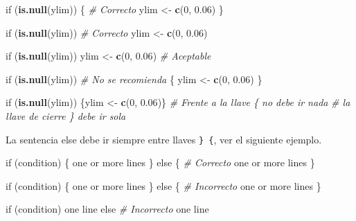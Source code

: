 \documentclass[10pt,]{krantz}
\makeatletter
\newenvironment{Shaded}{\begin{snugshade}}{\end{snugshade}}
\newcommand{\KeywordTok}[1]{\textcolor[rgb]{0.13,0.29,0.53}{\textbf{{#1}}}}
\newcommand{\DecValTok}[1]{\textcolor[rgb]{0.00,0.00,0.81}{{#1}}}
\newcommand{\FloatTok}[1]{\textcolor[rgb]{0.00,0.00,0.81}{{#1}}}
\newcommand{\StringTok}[1]{\textcolor[rgb]{0.31,0.60,0.02}{{#1}}}
\newcommand{\CommentTok}[1]{\textcolor[rgb]{0.56,0.35,0.01}{\textit{{#1}}}}
\newcommand{\NormalTok}[1]{{#1}}
\newenvironment{kframe}{%
\medskip{}
\setlength{\fboxsep}{.8em}
 \def\at@end@of@kframe{}%
 \ifinner\ifhmode%
  \def\at@end@of@kframe{\end{minipage}}%
  \begin{minipage}{\columnwidth}%
 \fi\fi%
 \def\FrameCommand##1{\hskip\@totalleftmargin \hskip-\fboxsep
 \colorbox{shadecolor}{##1}\hskip-\fboxsep
     \hskip-\linewidth \hskip-\@totalleftmargin \hskip\columnwidth}%
 \MakeFramed {\advance\hsize-\width
   \@totalleftmargin\z@ \linewidth\hsize
   \@setminipage}}%
 {\par\unskip\endMakeFramed%
 \at@end@of@kframe}
\renewenvironment{Shaded}{\begin{kframe}}{\end{kframe}}
\makeatother
\begin{document}
\begin{Shaded}
\begin{Highlighting}[]
\NormalTok{if (}\KeywordTok{is.null}\NormalTok{(ylim)) \{                     }\CommentTok{# Correcto}
  \NormalTok{ylim <-}\StringTok{ }\KeywordTok{c}\NormalTok{(}\DecValTok{0}\NormalTok{, }\FloatTok{0.06}\NormalTok{)}
\NormalTok{\}}

\NormalTok{if (}\KeywordTok{is.null}\NormalTok{(ylim))                       }\CommentTok{# Correcto}
  \NormalTok{ylim <-}\StringTok{ }\KeywordTok{c}\NormalTok{(}\DecValTok{0}\NormalTok{, }\FloatTok{0.06}\NormalTok{)}

\NormalTok{if (}\KeywordTok{is.null}\NormalTok{(ylim)) ylim <-}\StringTok{ }\KeywordTok{c}\NormalTok{(}\DecValTok{0}\NormalTok{, }\FloatTok{0.06}\NormalTok{)    }\CommentTok{# Aceptable}

\NormalTok{if (}\KeywordTok{is.null}\NormalTok{(ylim))                       }\CommentTok{# No se recomienda}
\NormalTok{\{        }
  \NormalTok{ylim <-}\StringTok{ }\KeywordTok{c}\NormalTok{(}\DecValTok{0}\NormalTok{, }\FloatTok{0.06}\NormalTok{)}
\NormalTok{\}}
    
\NormalTok{if (}\KeywordTok{is.null}\NormalTok{(ylim)) \{ylim <-}\StringTok{ }\KeywordTok{c}\NormalTok{(}\DecValTok{0}\NormalTok{, }\FloatTok{0.06}\NormalTok{)\}  }\CommentTok{# Frente a la llave \{ no debe ir nada}
                                         \CommentTok{# la llave de cierre \} debe ir sola}
\end{Highlighting}
\end{Shaded}

La sentencia else debe ir siempre entre llaves \texttt{\}\ \{}, ver el
siguiente ejemplo.

\begin{Shaded}
\begin{Highlighting}[]
\NormalTok{if (condition) \{         }
  \NormalTok{one or more lines}
\NormalTok{\} else \{                 }\CommentTok{# Correcto}
  \NormalTok{one or more lines}
\NormalTok{\}}


\NormalTok{if (condition) \{         }
  \NormalTok{one or more lines}
\NormalTok{\}}
\NormalTok{else \{                   }\CommentTok{# Incorrecto}
  \NormalTok{one or more lines}
\NormalTok{\}}


\NormalTok{if (condition)           }
  \NormalTok{one line}
\NormalTok{else                     }\CommentTok{# Incorrecto}
  \NormalTok{one line}
\end{Highlighting}
\end{Shaded}
\end{document}
